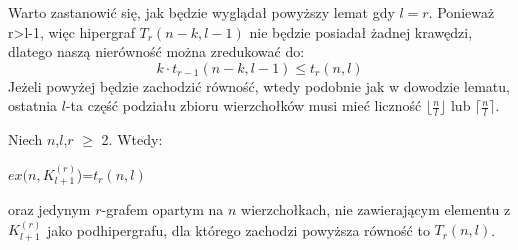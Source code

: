 \documentclass[miz,woman]{mgrwms}
\begin{document}
Warto zastanowić się, jak będzie wyglądał powyższy lemat gdy $l=r$. Ponieważ r>l-1, więc hipergraf $T_r(n-k,l-1)$ nie
będzie posiadał żadnej krawędzi, dlatego naszą nierówność można zredukować do:
\begin{equation}
k \cdot t_{r-1}(n-k,l-1)\leq t_r(n,l)
\end{equation}
Jeżeli powyżej będzie zachodzić równość, wtedy podobnie jak w dowodzie lematu, ostatnia $l$-ta część podziału zbioru wierzchołków
musi mieć liczność $\lfloor \frac{n}{l} \rfloor$ lub $\lceil \frac{n}{l} \rceil$.


\begin{tw}\label{Turan}
Niech $n$,$l$,$r$ $\geq$ 2. Wtedy:
\begin{center}
$ex(n,K_{l+1}^{(r)}$)=$t_r(n,l)$\\
\end{center}
oraz jedynym $r$-grafem opartym na $n$ wierzchołkach, nie zawierającym elementu z $K_{l+1}^{(r)}$ jako podhipergrafu,
dla którego zachodzi powyższa równość to $T_r(n,l)$.\\
\end{tw}
\end{document}

